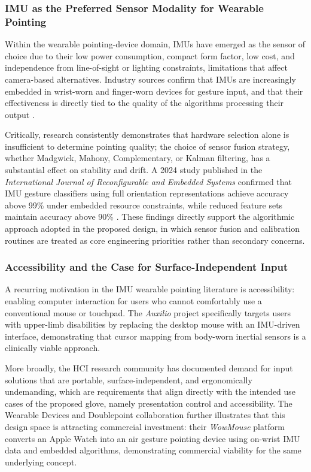 \subsubsection{IMU as the Preferred Sensor Modality for Wearable Pointing}

Within the wearable pointing-device domain, IMUs have emerged as the sensor of choice due to their low power consumption, compact form factor, low cost, and independence from line-of-sight or lighting constraints, limitations that affect camera-based alternatives. Industry sources confirm that IMUs are increasingly embedded in wrist-worn and finger-worn devices for gesture input, and that their effectiveness is directly tied to the quality of the algorithms processing their output \cite{gesture_market}.

Critically, research consistently demonstrates that hardware selection alone is insufficient to determine pointing quality; the choice of sensor fusion strategy, whether Madgwick, Mahony, Complementary, or Kalman filtering, has a substantial effect on stability and drift. A 2024 study published in the \textit{International Journal of Reconfigurable and Embedded Systems} confirmed that IMU gesture classifiers using full orientation representations achieve accuracy above 99\% under embedded resource constraints, while reduced feature sets maintain accuracy above 90\% \cite{gesture_hci_research}. These findings directly support the algorithmic approach adopted in the proposed design, in which sensor fusion and calibration routines are treated as core engineering priorities rather than secondary concerns.

\subsubsection{Accessibility and the Case for Surface-Independent Input}

A recurring motivation in the IMU wearable pointing literature is accessibility: enabling computer interaction for users who cannot comfortably use a conventional mouse or touchpad. The \textit{Auxilio} project specifically targets users with upper-limb disabilities by replacing the desktop mouse with an IMU-driven interface, demonstrating that cursor mapping from body-worn inertial sensors is a clinically viable approach.

More broadly, the HCI research community has documented demand for input solutions that are portable, surface-independent, and ergonomically undemanding, which are requirements that align directly with the intended use cases of the proposed glove, namely presentation control and accessibility. The Wearable Devices and Doublepoint collaboration further illustrates that this design space is attracting commercial investment: their \textit{WowMouse} platform converts an Apple Watch into an air gesture pointing device using on-wrist IMU data and embedded algorithms, demonstrating commercial viability for the same underlying concept.

